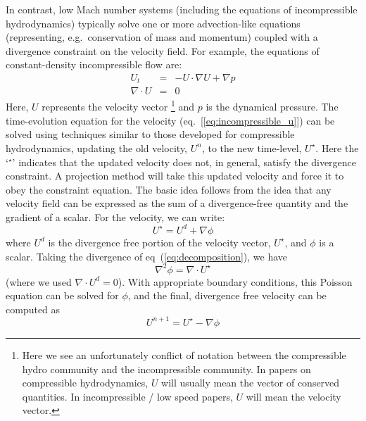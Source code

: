 In contrast, low Mach number systems (including the equations of
incompressible hydrodynamics) typically solve one or more
advection-like equations (representing, e.g.\ conservation of mass and
momentum) coupled with a divergence constraint on the velocity field.
For example, the equations of constant-density incompressible flow
are:
\begin{eqnarray}
U_t &=& -U \cdot \nabla U + \nabla p \label{eq:incompressible_u} \\
\nabla \cdot U &=& 0
\end{eqnarray}
Here, $U$ represents the velocity vector%
%
\footnote{Here we see an unfortunately conflict
of notation between the compressible hydro community and the
incompressible community.  In papers on compressible hydrodynamics,
$U$ will usually mean the vector of conserved quantities.  In 
incompressible / low speed papers, $U$ will mean the velocity vector.}
%
and $p$ is the dynamical pressure.  The time-evolution equation for
the velocity (eq.~[\ref{eq:incompressible_u}]) can be solved using
techniques similar to those developed for compressible hydrodynamics,
updating the old velocity, $U^n$, to the new time-level, $U^\star$.
Here the `$^\star$' indicates that the updated velocity does not, in
general, satisfy the divergence constraint.  A projection method will
take this updated velocity and force it to obey the constraint
equation.  The basic idea follows from the idea that any velocity
field can be expressed as the sum of a divergence-free quantity and
the gradient of a scalar.  For the velocity, we can write:
\begin{equation}
U^\star = U^d + \nabla \phi \label{eq:decomposition}
\end{equation}
where $U^d$ is the divergence free portion of the velocity vector,
$U^\star$, and $\phi$ is a scalar.  Taking the divergence of
eq~(\ref{eq:decomposition}), we have
\begin{equation}
\nabla^2 \phi = \nabla \cdot U^\star
\end{equation}
(where we used $\nabla \cdot U^d = 0$).
With appropriate boundary conditions, this Poisson equation can be
solved for $\phi$, and the final, divergence free velocity can 
be computed as
\begin{equation}
U^{n+1} = U^\star - \nabla \phi
\end{equation}

